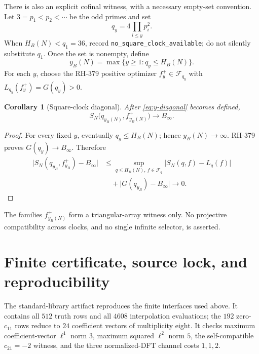 \documentclass[11pt]{article}
\newtheorem{corollary}[theorem]{Corollary}
\theoremstyle{definition}
\theoremstyle{remark}
\newcommand{\Fcal}{\mathcal F}
\newcommand{\abs}[1]{\lvert#1\rvert}
\begin{document}
There is also an explicit cofinal witness, with a necessary empty-set
convention.  Let $3=p_1<p_2<\cdots$ be the odd primes and set
\begin{equation}
                       q_y=4\prod_{i\le y}p_i^2.
 \label{eq:square-clocks}
\end{equation}
When $H_B(N)<q_1=36$, record
\texttt{no\_square\_clock\_available}; do not silently substitute $q_1$.
Once the set is nonempty, define
\begin{equation}
 y_B(N)=\max\{y\ge1:q_y\le H_B(N)\}.
 \label{eq:y-diagonal}
\end{equation}
For each $y$, choose the RH-379 positive optimizer
$f_y^+\in\Fcal_{q_y}$ with $L_{q_y}(f_y^+)=G(q_y)>0$.

\begin{corollary}[Square-clock diagonal]
\label{cor:diagonal}
After \eqref{eq:y-diagonal} becomes defined,
\begin{equation}
 S_N\bigl(q_{y_B(N)},f_{y_B(N)}^+\bigr)\longrightarrow B_\infty.
 \label{eq:diagonal-limit}
\end{equation}
\end{corollary}

\begin{proof}
For every fixed $y$, eventually $q_y\le H_B(N)$; hence
$y_B(N)\to\infty$.  RH-379 proves $G(q_y)\to B_\infty$.  Therefore
\begin{align*}
 \abs{S_N(q_{y_B},f_{y_B}^+)-B_\infty}
 &\le\sup_{q\le H_B(N),\ f\in\Fcal_q}\abs{S_N(q,f)-L_q(f)}\\
 &\quad+\abs{G(q_{y_B})-B_\infty}\longrightarrow0.
\end{align*}
\end{proof}

The families $f_{y_B(N)}^+$ form a triangular-array witness only.  No
projective compatibility across clocks, and no single infinite selector,
is asserted.

\section{Finite certificate, source lock, and reproducibility}

The standard-library artifact reproduces the finite interfaces used above.
It contains all $512$ truth rows and all $4608$ interpolation evaluations;
the $192$ zero-$c_{11}$ rows reduce to $24$ coefficient vectors of
multiplicity eight.  It checks maximum coefficient-vector $\ell^1$ norm
$3$, maximum squared $\ell^2$ norm $5$, the self-compatible
$c_{21}=-2$ witness, and the three normalized-DFT channel costs $1,1,2$.
\end{document}
